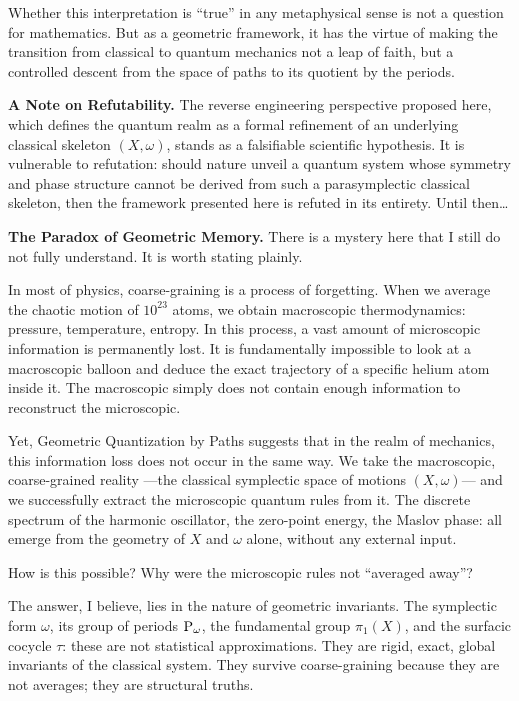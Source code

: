 \documentclass[10pt,reqno,letterpaper,twoside]{amsbook}
\begin{document}
  Whether this interpretation is ``true''
  in any metaphysical sense is not a question for mathematics.
  But as a geometric framework,
  it has the virtue of making the transition
  from classical to quantum mechanics
  not a leap of faith,
  but a controlled descent
  from the space of paths to its quotient by the periods.
  
  \textbf{A Note on Refutability.}
  The reverse engineering perspective proposed here,
  which defines the quantum realm as a formal refinement of an underlying classical skeleton $(X, \omega)$,
  stands as a falsifiable scientific hypothesis.
  It is vulnerable to refutation:
  should nature unveil a quantum system whose symmetry and phase structure cannot be derived from such a parasymplectic classical skeleton,
  then the framework presented here is refuted in its entirety.
  Until then\dots
  
  \smallskip
  \textbf{The Paradox of Geometric Memory.}
  There is a mystery here that I still do not fully understand.
  It is worth stating plainly.
  
  In most of physics,
  coarse-graining is a process of forgetting.
  When we average the chaotic motion of $10^{23}$ atoms,
  we obtain macroscopic thermodynamics:
  pressure, temperature, entropy.
  In this process,
  a vast amount of microscopic information is permanently lost.
  It is fundamentally impossible to look at a macroscopic balloon
  and deduce the exact trajectory of a specific helium atom inside it.
  The macroscopic simply does not contain enough information
  to reconstruct the microscopic.
  
  Yet,
  Geometric Quantization by Paths suggests
  that in the realm of mechanics,
  this information loss does not occur in the same way.
  We take the macroscopic, coarse-grained reality
  ---the classical symplectic space of motions $(X,\omega)$---
  and we successfully extract the microscopic quantum rules from it.
  The discrete spectrum of the harmonic oscillator,
  the zero-point energy,
  the Maslov phase:
  all emerge from the geometry of $X$ and $\omega$ alone,
  without any external input.
  
  How is this possible?
  Why were the microscopic rules not ``averaged away''?
  
  The answer,
  I believe,
  lies in the nature of geometric invariants.
  The symplectic form $\omega$,
  its group of periods $\operatorname{P}_\omega$,
  the fundamental group $\pi_1(X)$,
  and the surfacic cocycle $\tau$:
  these are not statistical approximations.
  They are rigid,
  exact,
  global invariants of the classical system.
  They survive coarse-graining because they are not averages;
  they are structural truths.
  
\end{document}
